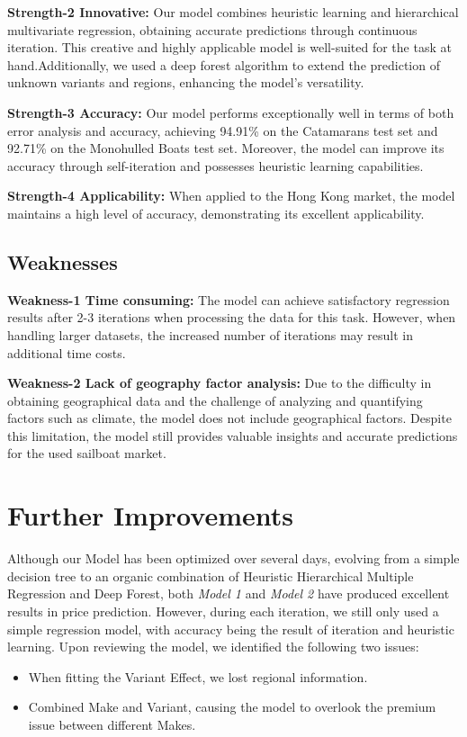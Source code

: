\documentclass[12pt]{article}  %
\begin{document}
\textbf{Strength-2 Innovative:}
Our model combines heuristic learning and hierarchical multivariate regression, obtaining accurate predictions through continuous iteration. This creative and highly applicable model is well-suited for the task at hand.Additionally, we used a deep forest algorithm to extend the prediction of unknown variants and regions, enhancing the model's versatility. 

\textbf{Strength-3 Accuracy:}
Our model performs exceptionally well in terms of both error analysis and accuracy, achieving 94.91\% on the Catamarans test set and 92.71\% on the Monohulled Boats test set. Moreover, the model can improve its accuracy through self-iteration and possesses heuristic learning capabilities.

\textbf{Strength-4 Applicability:}
When applied to the Hong Kong market, the model maintains a high level of accuracy, demonstrating its excellent applicability. 

\subsection{Weaknesses}
\textbf{Weakness-1 Time consuming:}
The model can achieve satisfactory regression results after 2-3 iterations when processing the data for this task. However, when handling larger datasets, the increased number of iterations may result in additional time costs.

\textbf{Weakness-2 Lack of geography  factor analysis:}
Due to the difficulty in obtaining geographical data and the challenge of analyzing and quantifying factors such as climate, the model does not include geographical factors. Despite this limitation, the model still provides valuable insights and accurate predictions for the used sailboat market.

\section{Further Improvements}
Although our Model has been optimized over several days, evolving from a simple decision tree to an organic combination of Heuristic Hierarchical Multiple Regression and Deep Forest, both \emph{Model 1} and \emph{Model 2} have produced excellent results in price prediction. However, during each iteration, we still only used a simple regression model, with accuracy being the result of iteration and heuristic learning. Upon reviewing the model, we identified the following two issues:
\begin{itemize}
    \item When fitting the Variant Effect, we lost regional information.
    \item Combined Make and Variant, causing the model to overlook the premium issue between different Makes.
\end{itemize}
\end{document}
